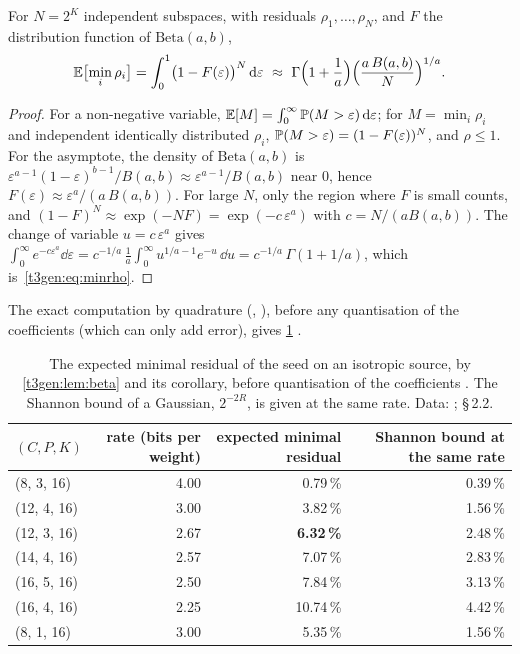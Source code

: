 \begin{corollaire}\label{t3gen:cor:beta}
For $N = 2^K$ independent subspaces, with residuals $\rho_1, \ldots, \rho_N$, and $F$ the distribution function of $\mathrm{Beta}(a, b)$,
\begin{equation}\label{t3gen:eq:minrho}
\mathbb{E}\bigl[\min_i \rho_i\bigr] = \int_0^1 \bigl(1 - F(\varepsilon)\bigr)^N\, \mathrm{d}\varepsilon \ \approx\ \Gamma\Bigl(1 + \frac1a\Bigr) \Bigl(\frac{a\, B(a, b)}{N}\Bigr)^{1/a} .
\end{equation}
\end{corollaire}

\begin{proof}
For a non-negative variable, $\mathbb{E}[M] = \int_0^\infty \mathbb{P}(M > \varepsilon)\,\mathrm{d}\varepsilon$; for $M = \min_i \rho_i$ and independent identically distributed $\rho_i$, $\mathbb{P}(M > \varepsilon) = (1 - F(\varepsilon))^N$, and $\rho \le 1$. For the asymptote, the density of $\mathrm{Beta}(a, b)$ is $\varepsilon^{a-1}(1-\varepsilon)^{b-1}/B(a,b) \approx \varepsilon^{a-1}/B(a,b)$ near 0, hence $F(\varepsilon) \approx \varepsilon^a / (a\, B(a,b))$. For large $N$, only the region where $F$ is small counts, and $(1 - F)^N \approx \exp(-N F) = \exp(-c\, \varepsilon^a)$ with $c = N/(a B(a,b))$. The change of variable $u = c\,\varepsilon^a$ gives $\int_0^\infty e^{-c\varepsilon^a}\dd\varepsilon = c^{-1/a}\,\frac1a \int_0^\infty u^{1/a - 1} e^{-u}\,\dd u = c^{-1/a}\,\Gamma(1 + 1/a)$, which is~\eqref{t3gen:eq:minrho}.
\end{proof}

The exact computation by quadrature (, ), before any quantisation of the coefficients (which can only add error), gives \cref{t3gen:tab:theorie} \calc.

\begin{table}[tbp]
\centering\small
\begin{tabular}{l r r r}
\toprule
$(C, P, K)$ & rate (bits per weight) & expected minimal residual & Shannon bound at the same rate \\
\midrule
(8, 3, 16) & 4.00 & 0.79\,\% & 0.39\,\% \\
(12, 4, 16) & 3.00 & 3.82\,\% & 1.56\,\% \\
(12, 3, 16) & 2.67 & \textbf{6.32\,\%} & 2.48\,\% \\
(14, 4, 16) & 2.57 & 7.07\,\% & 2.83\,\% \\
(16, 5, 16) & 2.50 & 7.84\,\% & 3.13\,\% \\
(16, 4, 16) & 2.25 & 10.74\,\% & 4.42\,\% \\
(8, 1, 16) & 3.00 & 5.35\,\% & 1.56\,\% \\
\bottomrule
\end{tabular}
\caption[The seed predicted by lemma 1]{The expected minimal residual of the seed on an isotropic source, by \cref{t3gen:lem:beta} and its corollary, before quantisation of the coefficients \calc. The Shannon bound of a Gaussian, $2^{-2R}$, is given at the same rate. Data: ;  §\,2.2.}
\label{t3gen:tab:theorie}
\end{table}

